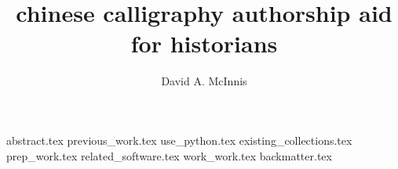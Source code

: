 \documentclass{ewuthesis}
\begin{document}
    \title{chinese calligraphy authorship aid for historians}
    \author{David A. McInnis}    
    \frontmatter
    \maketitle          %
    \makesigpage        %
    {abstract.tex}
    \mainmatter
    {previous_work.tex}
    {use_python.tex}
    {existing_collections.tex}
    {prep_work.tex}
    {related_software.tex}
    {work_work.tex}
    {backmatter.tex}
    
    
    \newpage
    \makevita
    
    
\end{document}
